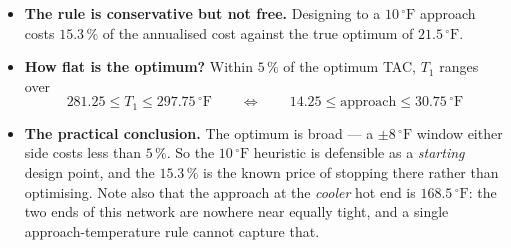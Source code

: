 \documentclass[10pt,a4paper]{article}
\newcommand{\degreef}{\ensuremath{^\circ\mathrm{F}}}
\begin{document}
\begin{itemize}
\item \textbf{The rule is conservative but not free.} Designing to a $10\,\degreef$ approach costs $15.3\,\%$ of the annualised cost against the true optimum of $21.5\,\degreef$.
\item \textbf{How flat is the optimum?} Within $5\,\%$ of the optimum TAC, $T_1$ ranges over
\[
281.25 \le T_1 \le 297.75\,\degreef
\qquad\Longleftrightarrow\qquad
14.25 \le \text{approach} \le 30.75\,\degreef
\]
\item \textbf{The practical conclusion.} The optimum is broad --- a $\pm8\,\degreef$ window either side costs less than $5\,\%$. So the $10\,\degreef$ heuristic is defensible as a \emph{starting} design point, and the $15.3\,\%$ is the known price of stopping there rather than optimising. Note also that the approach at the \emph{cooler} hot end is $168.5\,\degreef$: the two ends of this network are nowhere near equally tight, and a single approach-temperature rule cannot capture that.
\end{itemize}
\end{document}
